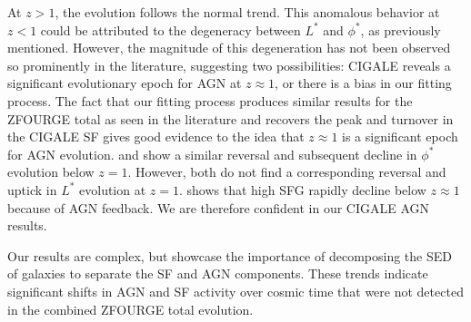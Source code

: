 At $z>1$, the evolution follows the normal trend. This anomalous behavior at $z<1$ could be attributed to the degeneracy between $L^{*}$ and $\phi^{*}$, as previously mentioned. However, the magnitude of this degeneration has not been observed so prominently in the literature, suggesting two possibilities: CIGALE reveals a significant evolutionary epoch for AGN at $z\approx1$, or there is a bias in our fitting process. The fact that our fitting process produces similar results for the ZFOURGE total as seen in the literature and recovers the peak and turnover in the CIGALE SF gives good evidence to the idea that $z\approx1$ is a significant epoch for AGN evolution. \cite{delvecchio_tracing_2014} and \cite{hopkins_observational_2007} show a similar reversal and subsequent decline in $\phi^{*}$ evolution below $z=1$. However, both do not find a corresponding reversal and uptick in $L^{*}$ evolution at $z=1$. \cite{katsianis_evolution_2017} shows that high SFG rapidly decline below $z\approx1$ because of AGN feedback. We are therefore confident in our CIGALE AGN results. 

Our results are complex, but showcase the importance of decomposing the SED of galaxies to separate the SF and AGN components. These trends indicate significant shifts in AGN and SF activity over cosmic time that were not detected in the combined ZFOURGE total evolution.




